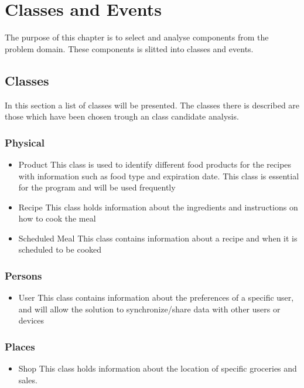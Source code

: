 \chapter{Classes and Events}
The purpose of this chapter is to select and analyse components from the problem domain. These components is slitted into classes and events.

\section{Classes}
In this section a list of classes will be presented. The classes there is described are those which have been chosen trough an class candidate analysis.

\subsection{Physical}

\begin{itemize}
\item Product
	\subitem This class is used to identify different food products for the recipes with information such as food type and expiration date. This class is essential for the program and will be used frequently
\item Recipe
	\subitem This class holds information about the ingredients and instructions on how to cook the meal
\item Scheduled Meal
	\subitem This class contains information about a recipe and when it is scheduled to be cooked
\end{itemize}

\subsection{Persons}
\begin{itemize}
\item User
	\subitem This class contains information about the preferences of a specific user, and will allow the solution to synchronize/share data with other users or devices
\end{itemize}

\subsection{Places}
\begin{itemize}
\item Shop
	\subitem This class holds information about the location of specific groceries and sales.
\end{itemize}

